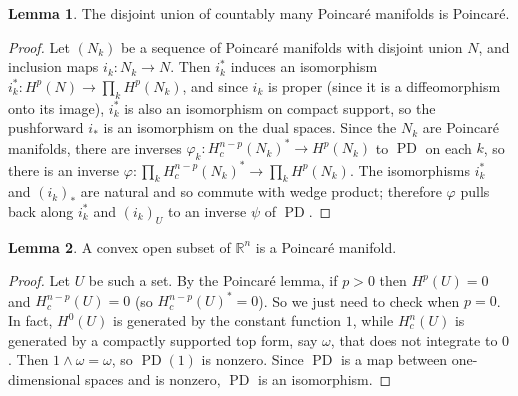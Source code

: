 \documentclass[10pt]{article}
\newcommand{\RR}{\mathbb{R}}
\DeclareMathOperator{\PD}{PD}
\theoremstyle{definition}
\newtheorem{lemma}{Lemma}[exer]
\begin{document}
\begin{lemma}
\label{disjoint poincare}
The disjoint union of countably many Poincar\'e manifolds is Poincar\'e.
\end{lemma}
\begin{proof}
Let $(N_k)$ be a sequence of Poincar\'e manifolds with disjoint union $N$, and inclusion maps $i_k: N_k \to N$.
Then $i_k^*$ induces an isomorphism $i_k^*: H^p(N) \to \prod_k H^p(N_k)$, and since $i_k$ is proper (since it is a diffeomorphism onto its image),
$i_k^*$ is also an isomorphism on compact support, so the pushforward $i_*$ is an isomorphism on the dual spaces.
Since the $N_k$ are Poincar\'e manifolds, there are inverses $\varphi_k: H^{n-p}_c(N_k)^* \to H^p(N_k)$ to $\PD$ on each $k$, so there is an inverse $\varphi: \prod_k H^{n-p}_c(N_k)^* \to \prod_k H^p(N_k)$.
The isomorphisms $i_k^*$ and $(i_k)_*$ are natural and so commute with wedge product; therefore $\varphi$ pulls back along $i_k^*$ and $(i_k)_U$ to an inverse $\psi$ of $\PD$.
\end{proof}

\begin{lemma}
\label{convex poincare}
A convex open subset of $\RR^n$ is a Poincar\'e manifold.
\end{lemma}
\begin{proof}
Let $U$ be such a set.
By the Poincar\'e lemma, if $p > 0$ then $H^p(U) = 0$ and $H^{n-p}_c(U) = 0$ (so $H^{n-p}_c(U)^* = 0$).
So we just need to check when $p = 0$. In fact, $H^0(U)$ is generated by the constant function $1$, while $H^n_c(U)$ is generated by a compactly supported top form, say $\omega$, that does not integrate to $0$. Then $1 \wedge \omega = \omega$, so $\PD(1)$ is nonzero.
Since $\PD$ is a map between one-dimensional spaces and is nonzero, $\PD$ is an isomorphism.
\end{proof}
\end{document}
